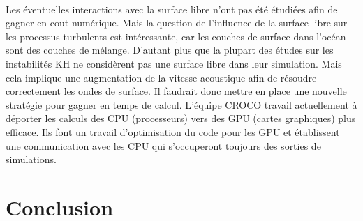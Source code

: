 \documentclass[a4paper,12pt]{article}
\begin{document}
    \\
    \newline
    Les éventuelles interactions avec la surface libre n'ont pas été étudiées afin de gagner en cout numérique. Mais la question de l'influence de la surface libre sur les processus turbulents est intéressante, car les couches de surface dans l'océan sont des couches de mélange. D'autant plus que la plupart des études sur les instabilités KH ne considèrent pas une surface libre dans leur simulation. Mais cela implique une augmentation de la vitesse acoustique afin de résoudre correctement les ondes de surface. Il faudrait donc mettre en place une nouvelle stratégie pour gagner en temps de calcul. L'équipe CROCO travail actuellement à déporter les calculs des CPU (processeurs) vers des GPU (cartes graphiques) plus efficace. Ils font un travail d'optimisation du code pour les GPU et établissent une communication avec les CPU qui s'occuperont toujours des sorties de simulations. 


\section{Conclusion}


\newpage


%
\end{document}
